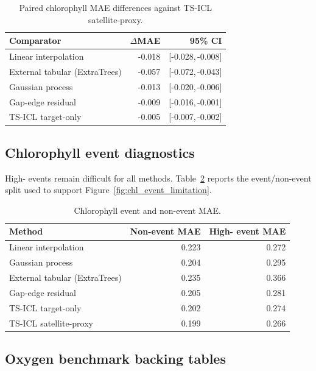 \begin{table}[H]
  \centering
  \small
  \caption{Paired chlorophyll MAE differences against TS-ICL satellite-proxy.}
  \label{tab:appendix_chl_paired_deltas}
  \begin{tabular}{l r r}
    \toprule
    Comparator & $\Delta$MAE & 95\% CI \\
    \midrule
    Linear interpolation & -0.018 & [-0.028,\,-0.008] \\
    External tabular (ExtraTrees) & -0.057 & [-0.072,\,-0.043] \\
    Gaussian process & -0.013 & [-0.020,\,-0.006] \\
    Gap-edge residual & -0.009 & [-0.016,\,-0.001] \\
    TS-ICL target-only & -0.005 & [-0.007,\,-0.002] \\
    \bottomrule
  \end{tabular}
\end{table}

\subsection{Chlorophyll event diagnostics}
\label{app:chl_extended_diagnostics}

High-\chl{} events remain difficult for all methods. Table~\ref{tab:appendix_chl_event_mae}
reports the event/non-event split used to support Figure~\ref{fig:chl_event_limitation}.

\begin{table}[H]
  \centering
  \small
  \caption{Chlorophyll event and non-event MAE.}
  \label{tab:appendix_chl_event_mae}
  \begin{tabular}{l r r}
    \toprule
    Method & Non-event MAE & High-\chl{} event MAE \\
    \midrule
    Linear interpolation & 0.223 & 0.272 \\
    Gaussian process & 0.204 & 0.295 \\
    External tabular (ExtraTrees) & 0.235 & 0.366 \\
    Gap-edge residual & 0.205 & 0.281 \\
    TS-ICL target-only & 0.202 & 0.274 \\
    TS-ICL satellite-proxy & 0.199 & 0.266 \\
    \bottomrule
  \end{tabular}
\end{table}

\subsection{Oxygen benchmark backing tables}
\label{app:oxygen_benchmark_tables}


